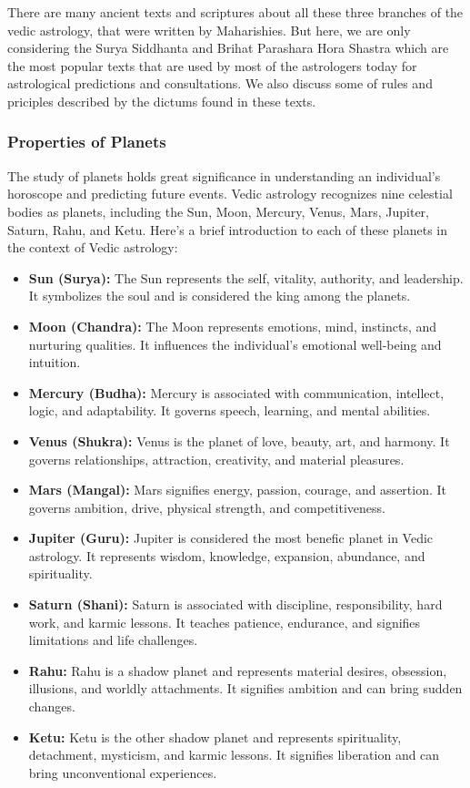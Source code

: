 There are many ancient texts and scriptures about all these three branches of the vedic astrology, that were written by Maharishies. But here, we are only considering the Surya Siddhanta\cite{SuryaSiddhanta, wiki:ss} and Brihat Parashara Hora Shastra\cite{BrihatParasharHoraShastraVol1, BrihatParasharHoraShastraVol2, wiki:bphs} which are the most popular texts that are used by most of the astrologers today for astrological predictions and consultations. We also discuss some of rules and priciples described by the dictums found in these texts.

\subsubsection{Properties of Planets}
The study of planets holds great significance in understanding an individual's horoscope and predicting future events. Vedic astrology recognizes nine celestial bodies as planets, including the Sun, Moon, Mercury, Venus, Mars, Jupiter, Saturn, Rahu, and Ketu. Here's a brief introduction to each of these planets in the context of Vedic astrology:

\begin{itemize}
	\item \textbf{Sun (Surya):} The Sun represents the self, vitality, authority, and leadership. It symbolizes the soul and is considered the king among the planets.
	\item \textbf{Moon (Chandra):} The Moon represents emotions, mind, instincts, and nurturing qualities. It influences the individual's emotional well-being and intuition.
	\item \textbf{Mercury (Budha):} Mercury is associated with communication, intellect, logic, and adaptability. It governs speech, learning, and mental abilities.
	\item \textbf{Venus (Shukra):} Venus is the planet of love, beauty, art, and harmony. It governs relationships, attraction, creativity, and material pleasures.
	\item \textbf{Mars (Mangal):} Mars signifies energy, passion, courage, and assertion. It governs ambition, drive, physical strength, and competitiveness.
	\item \textbf{Jupiter (Guru):} Jupiter is considered the most benefic planet in Vedic astrology. It represents wisdom, knowledge, expansion, abundance, and spirituality.
	\item \textbf{Saturn (Shani):} Saturn is associated with discipline, responsibility, hard work, and karmic lessons. It teaches patience, endurance, and signifies limitations and life challenges.
	\item \textbf{Rahu:} Rahu is a shadow planet and represents material desires, obsession, illusions, and worldly attachments. It signifies ambition and can bring sudden changes.
	\item \textbf{Ketu:} Ketu is the other shadow planet and represents spirituality, detachment, mysticism, and karmic lessons. It signifies liberation and can bring unconventional experiences.
\end{itemize}

